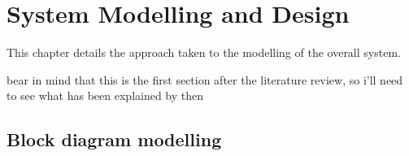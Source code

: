 \chapter{System Modelling and Design}

This chapter details the approach taken to the modelling of the overall system.

{\Large \color{red} bear in mind that this is the first section after the literature review, so i'll need to see what has been explained by then}

\section{Block diagram modelling}
